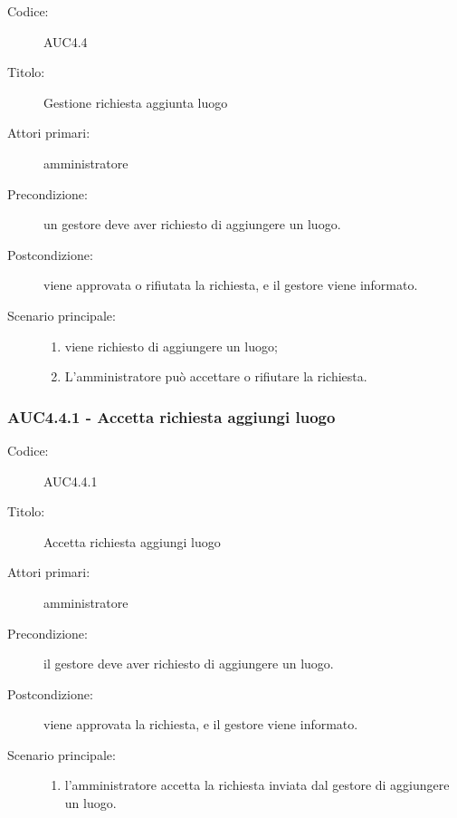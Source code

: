 \documentclass[casi-duso]{subfiles}
\begin{document}
\begin{description}
  \item[Codice:] AUC4.4
  \item[Titolo:] Gestione richiesta aggiunta luogo
  \item[Attori primari:] amministratore
  \item[Precondizione:] un gestore deve aver richiesto di aggiungere un luogo.
  \item[Postcondizione:] viene approvata o rifiutata la richiesta, e il gestore viene informato.
  \item[Scenario principale:]
  \begin{enumerate}
    \item viene richiesto di aggiungere un luogo;
    \item L'amministratore può accettare o rifiutare la richiesta.
  \end{enumerate}
\end{description}

\subsubsection{AUC4.4.1 - Accetta richiesta aggiungi luogo}%
\label{subsub:AUC4.4.1}
\begin{description}
  \item[Codice:] AUC4.4.1
  \item[Titolo:] Accetta richiesta aggiungi luogo
  \item[Attori primari:] amministratore
  \item[Precondizione:] il gestore deve aver richiesto di aggiungere un luogo.
  \item[Postcondizione:] viene approvata la richiesta, e il gestore viene informato.
  \item[Scenario principale:]
  \begin{enumerate}
    \item  l'amministratore accetta la richiesta inviata dal gestore di aggiungere un luogo.
  \end{enumerate}
\end{description}
\end{document}
